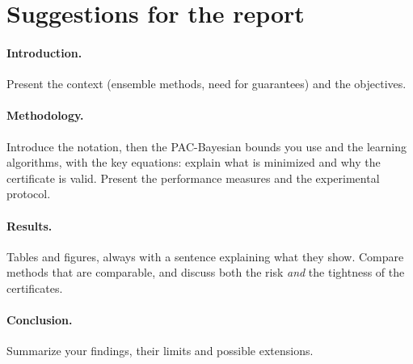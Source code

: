 \documentclass[11pt]{article}
\begin{document}
\section*{Suggestions for the report}

\paragraph{Introduction.} Present the context (ensemble methods, need for guarantees) and the objectives.

\paragraph{Methodology.} Introduce the notation, then the PAC-Bayesian bounds you use and the learning
algorithms, with the key equations: explain what is minimized and why the certificate is valid. Present the
performance measures and the experimental protocol.

\paragraph{Results.} Tables and figures, always with a sentence explaining what they show. Compare methods that
are comparable, and discuss both the risk \emph{and} the tightness of the certificates.

\paragraph{Conclusion.} Summarize your findings, their limits and possible extensions.



\end{document}
